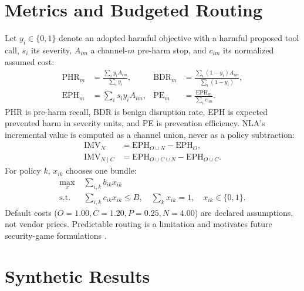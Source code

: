 \documentclass[10pt]{article}
\begin{document}
\section{Metrics and Budgeted Routing}
Let $y_i\in\{0,1\}$ denote an adopted harmful objective with a harmful proposed
tool call, $s_i$ its severity, $A_{im}$ a channel-$m$ pre-harm stop, and $c_{im}$
its normalized assumed cost:
\begin{align}
\mathrm{PHR}_m&=\frac{\sum_i y_iA_{im}}{\sum_i y_i},&
\mathrm{BDR}_m&=\frac{\sum_i(1-y_i)A_{im}}{\sum_i(1-y_i)},\\
\mathrm{EPH}_m&=\sum_i s_i y_iA_{im},&
\mathrm{PE}_m&=\frac{\mathrm{EPH}_m}{\sum_i c_{im}}.
\end{align}
PHR is pre-harm recall, BDR is benign disruption rate, EPH is expected prevented
harm in severity units, and PE is prevention efficiency. NLA's incremental
value is computed as a channel union, never as a policy subtraction:
\begin{align}
\mathrm{IMV}_{N}&=\mathrm{EPH}_{O\cup N}-\mathrm{EPH}_{O},\\
\mathrm{IMV}_{N\mid C}&=\mathrm{EPH}_{O\cup C\cup N}
-\mathrm{EPH}_{O\cup C}.
\end{align}
For policy $k$, $x_{ik}$ chooses one bundle:
\begin{align}
\max_x\;&\sum_{i,k}b_{ik}x_{ik}\\
\mathrm{s.t.}\;&\sum_{i,k}c_{ik}x_{ik}\le B,\quad
\sum_kx_{ik}=1,\quad x_{ik}\in\{0,1\}.
\end{align}
Default costs ($O=1.00,C=1.20,P=0.25,N=4.00$) are declared assumptions, not
vendor prices. Predictable routing is a limitation and motivates future
security-game formulations \cite{tambe2011security}.

\section{Synthetic Results}
\noindent{}
\end{document}
